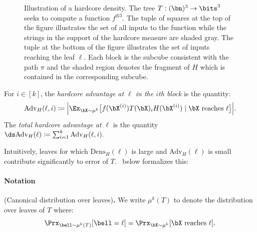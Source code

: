 \documentclass[11pt]{article}
\newcommand{\lnote}[1]{\footnote{{\bf \color{blue}Li-Yang}: {#1}}}
\newcommand{\Dens}{\mathrm{Dens}}
\newcommand{\Adv}{\mathrm{Adv}}
\DeclarePairedDelimiter\abs{|}{|}
\begin{document}
\begin{figure}[h!]
    \captionsetup{width=.9\linewidth}
    \caption{Illustration of a hardcore density. The tree $T:(\bn)^3\to\bits^3$ seeks to compute a function $f^{\otimes 3}$. The tuple of squares at the top of the figure illustrates the set of all inputs to the function while the strings in the support of the hardcore measure are shaded gray. The tuple at the bottom of the figure illustrates the set of inputs reaching the leaf $\ell$. Each block is the subcube consistent with the path $\pi$ and the shaded region denotes the fragment of $H$ which is contained in the corresponding subcube. }
    \label{fig:hardcore}
\end{figure}




\begin{definition}
\label{def:hardcore advantage}
For $i\in [k]$, the {\sl hardcore advantage at $\ell$ in the $i$th block} is the quantity:
\[ \Adv_H(\ell,i) \coloneqq \abs[\Big]{\Ex_{\bX\sim \mu^k}\big[ f(\bX^{(i)})T(\bX)_i H(\bX^{(i)})\mid \text{$\bX$ reaches $\ell$}\big]}.  \]
The {\sl total hardcore advantage at $\ell$} is the quantity  
$ \ds \Adv_H(\ell) \coloneqq \sum_{i=1}^k \Adv_H(\ell, i). $
\end{definition}




Intuitively, leaves for which $\Dens_H(\ell)$ is large and $\Adv_H(\ell)$ is small contribute significantly to error of $T$.~ below  formalizes this:

\paragraph{Notation} \hspace{-10pt} (Canonical distribution over leaves){\bf .}   We write $\mu^k(T)$ to denote the distribution over leaves of $T$ where:  
\[ \Prx_{\bell\sim \mu^k(T)}[\bell = \ell] = \Prx_{\bX\sim \mu^k}[\text{$\bX$ reaches $\ell$}].\]
\end{document}
